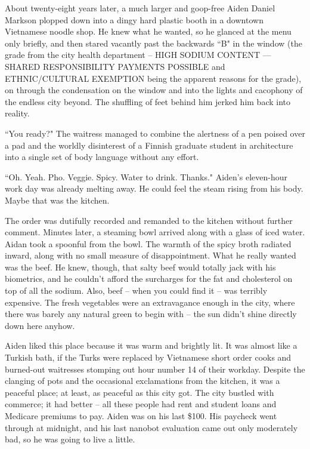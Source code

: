 \documentclass[11pt]{book}
\begin{document}
	About twenty-eight years later, a much larger and goop-free Aiden Daniel Markson plopped down into a dingy hard plastic booth in a downtown Vietnamese noodle shop. He knew what he wanted, so he glanced at the menu only briefly, and then stared vacantly past the backwards  ``B" in the window (the grade from the city health department -- HIGH SODIUM CONTENT --- SHARED RESPONSIBILITY PAYMENTS POSSIBLE and ETHNIC/CULTURAL EXEMPTION being the apparent reasons for the grade), on through the condensation on the window and into the lights and cacophony of the endless city beyond. The shuffling of feet behind him jerked him back into reality.
	
	``You ready?" The waitress managed to combine the alertness of a pen poised over a pad and the worldly disinterest of a Finnish graduate student in architecture into a single set of body language without any effort.
	
	``Oh. Yeah. Pho. Veggie. Spicy. Water to drink. Thanks." Aiden's eleven-hour work day was already melting away. He could feel the steam rising from his body. Maybe that was the kitchen.
	
	The order was dutifully recorded and remanded to the kitchen without further comment. Minutes later, a steaming bowl arrived along with a glass of iced water. Aidan took a spoonful from the bowl. The warmth of the spicy broth radiated inward, along with no small measure of disappointment. What he really wanted was the beef. He knew, though, that salty beef would totally jack with his biometrics, and he couldn't afford the surcharges for the fat and cholesterol on top of all the sodium. Also, beef -- when you could find it -- was terribly expensive. The fresh vegetables were an extravagance enough in the city, where there was barely any natural green to begin with -- the sun didn't shine directly down here anyhow. 
	
	Aiden liked this place because it was warm and brightly lit. It was almost like a Turkish bath, if the Turks were replaced by Vietnamese short order cooks and burned-out waitresses stomping out hour number 14 of their workday. Despite the clanging of pots and the occasional exclamations from the kitchen, it was a peaceful place; at least, as peaceful as this city got. The city bustled with commerce; it had better -- all these people had rent and student loans and Medicare premiums to pay. Aiden was on his last \$100. His paycheck went through at midnight, and his last nanobot evaluation came out only moderately bad, so he was going to live a little.
	
\end{document}
